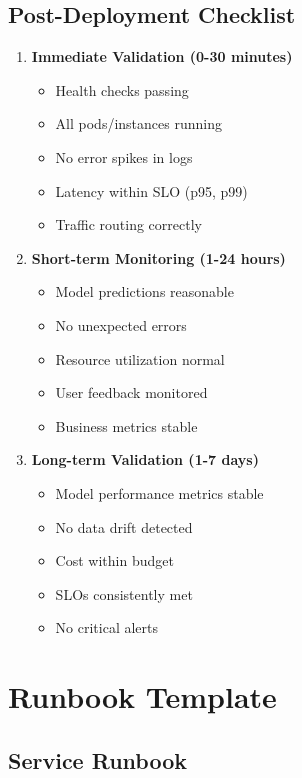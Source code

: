 \subsection{Post-Deployment Checklist}

\begin{enumerate}
    \item \textbf{Immediate Validation (0-30 minutes)}
    \begin{itemize}
        \item[ ] Health checks passing
        \item[ ] All pods/instances running
        \item[ ] No error spikes in logs
        \item[ ] Latency within SLO (p95, p99)
        \item[ ] Traffic routing correctly
    \end{itemize}

    \item \textbf{Short-term Monitoring (1-24 hours)}
    \begin{itemize}
        \item[ ] Model predictions reasonable
        \item[ ] No unexpected errors
        \item[ ] Resource utilization normal
        \item[ ] User feedback monitored
        \item[ ] Business metrics stable
    \end{itemize}

    \item \textbf{Long-term Validation (1-7 days)}
    \begin{itemize}
        \item[ ] Model performance metrics stable
        \item[ ] No data drift detected
        \item[ ] Cost within budget
        \item[ ] SLOs consistently met
        \item[ ] No critical alerts
    \end{itemize}
\end{enumerate}

\section{Runbook Template}

\subsection{Service Runbook}

